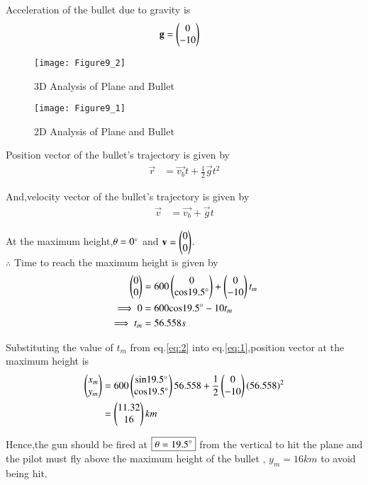 \documentclass[journal,12pt,twocolumn]{IEEEtran}
\begin{document}
Acceleration of the bullet due to gravity is
\begin{align}
    \mathbf{g} &= \begin{pmatrix}0 \\ -10\end{pmatrix}
\end{align}

\begin{figure}[!ht]
\centering
\texttt{[image: Figure9\_2]}
\caption{3D Analysis of Plane and Bullet}
\label{fig:3D}	
\end{figure}

\begin{figure}[!ht]
\centering
\texttt{[image: Figure9\_1]}
\caption{2D Analysis of Plane and Bullet}
\label{fig:2D}	
\end{figure}

Position vector of the bullet's trajectory is given by
\begin{align}
    \vec{r} &= \vec{v_b}t+\frac{1}{2}\vec{g}t^2  \label{eq:1}
\end{align}

And,velocity vector of the bullet's trajectory is given by
\begin{align}
    \vec{v} &= \vec{v_b}+\vec{g}t
\end{align}

At the maximum height,$\theta=0\degree$ and $\mathbf{v}=\begin{pmatrix}0\\0\end{pmatrix}$.
\\
$\therefore$ Time to reach the maximum height is given by
\begin{align}
    \begin{pmatrix}0\\0\end{pmatrix} &= 600\begin{pmatrix}0\\\text{cos}19.5\degree\end{pmatrix}+\begin{pmatrix}0\\-10\end{pmatrix}t_m
    \\
    \implies 0 &= 600\text{cos}19.5\degree - 10t_m
    \\
    \implies t_m &= 56.558 s  \label{eq:2}
\end{align}

Substituting the value of $t_m$ from eq.\eqref{eq:2} into eq.\eqref{eq:1},position vector at the maximum height is
\begin{align}
    \begin{pmatrix}x_m\\y_m\end{pmatrix} &= 600\begin{pmatrix}\text{sin}19.5\degree\\ \text{cos}19.5\degree\end{pmatrix}56.558 + \frac{1}{2}\begin{pmatrix}0\\-10\end{pmatrix}(56.558)^2
    \\
     &= \begin{pmatrix}11.32 \\ 16\end{pmatrix}km
\end{align}

Hence,the gun should be fired at $\boxed{\theta=19.5\degree}$ from the vertical to hit the plane and the pilot must fly above the maximum height of the bullet , $\boxed{y_m = 16 km}$ to avoid being hit.
\end{document}
